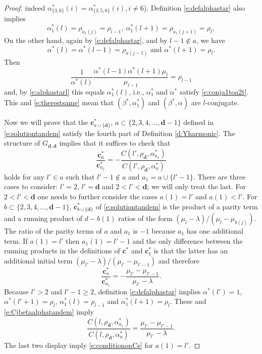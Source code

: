 \documentclass[11pt,a4paper]{article}
\begin{document}
\begin{proof}
indeed 
$ \alpha^*_{\{3,6\}}(i) = \alpha^*_{\{3,5,6\}}(i), i \neq 6$).
Definition
\eqref{e:defalphastar}
also implies 
\begin{equation}\label{e:alphastarl}
\alpha^*_1(l) = \rho_{a_1(j)} = \rho_{l-1},~ \alpha^*_1(l+1) = 
\rho_{a_1(j+1)} = \rho_l,
\end{equation}
On the other hand,
again by \eqref{e:defalphastar}, and by $l-1 \notin a$,
we have
\begin{equation*}%
\alpha^*(l) = \alpha^*(l-1) = \rho_{a(j-1)} \text{ and }  
\alpha^*(l+1) = \rho_l.
\end{equation*}
Then
\[
\frac{1}{\alpha^*(l)} \frac{\alpha^*(l-1) \alpha^*(l+1) \mu_l}{\mu_{l-1}}
= \rho_{l-1}
\]
and, by \eqref{e:alphastarl} this equals $\alpha^*_1(l)$, i.e.,
$\alpha^*_1$ and $\alpha^*$ satisfy \eqref{e:conja1toa2t}.
This and \eqref{e:therestsame} mean that 
$(\beta^*,\alpha_1^*)$ and $(\beta^*,\alpha)$ are
$l$-conjugate. 


Now we will prove that the 
${\boldsymbol c}^*_{a\cup\{\boldsymbol d\}}$, 
$a \subset \{2,3,4,...,{\bm d}-1\}$ defined in \eqref{e:solutiontandem}
satisfy the fourth part of Definition \ref{d:Yharmonic}. 
The structure of $G_{{\boldsymbol d},{\boldsymbol d}}$ implies 
that it suffices to check that 
\begin{equation}\label{e:conditiononCs}
\frac{{\boldsymbol c}^*_{a}}{{\boldsymbol c}^*_{a_1} } = 
-\frac{C(l',\rho_{\boldsymbol d}, \alpha^*_{a_1})}
{C(l',\rho_{\boldsymbol d},\alpha^*_a)}
\end{equation}
holds for any $ l' \in a$ such that $l'-1 \notin a$  and $a_1 = a \cup \{l'-1\}.$
There are three cases to consider: $l'=2$, $l'=\boldsymbol d$ 
and $2 < l' < \boldsymbol d$; we will only treat the last.
For $2 < l' < \boldsymbol d$ one needs to further 
consider the cases $a(1) = l'$ and $a(1) < l'$.
For $b \subset \{2,3,4,...,{\bm d}-1\}$, 
${\boldsymbol c}^*_{b\cup\{\boldsymbol d\}}$ of \eqref{e:solutiontandem}
is the product of a parity term and a running product of 
$d-b(1)$ ratios of the form $(\mu_l - \lambda)/(\mu_l - \mu_{b(j)}).$
The ratio of the parity terms of $a$ and $a_1$ is $-1$ because $a_1$ has one additional term.
If $a(1) = l'$ then $a_1(1) = l'-1$ and 
the only difference between the running products
in the definitions of ${\boldsymbol c}^*$ and ${\boldsymbol c}^*_1$
is that the latter has an additional initial term
$(\mu_{l'}-\lambda)/(\mu_{l'}-\mu_{l'-1})$ and therefore
\[
\frac{{\boldsymbol c}^*_{a}}{{\boldsymbol c}^*_{a_1}} = 
-\frac{ \mu_{l'}-\mu_{l'-1}}{\mu_{l'}-\lambda}.
\]
Because $l' > 2$ and $l'-1 \ge 2$, definition \eqref{e:defalphastar} 
implies $\alpha^*(l') =1$, $\alpha^*(l'+1) = \rho_l$,
$\alpha^*_1(l) = \rho_{l-1}$ and $\alpha^*_1(l+1) = \rho_l$.
These and \eqref{e:Cjbetaalphatandem} imply
\[
\frac{C(l,\rho_{\boldsymbol d}, \alpha^*_{a_1})}{C(l,\rho_{\boldsymbol d},\alpha^*_a)} = \frac{ \mu_{l'} - \mu_{l'-1}}{\mu_{l'} - \lambda}.
\]
The last two display imply \eqref{e:conditiononCs} for $a(1) = l'$. 


\end{proof}
\end{document}
